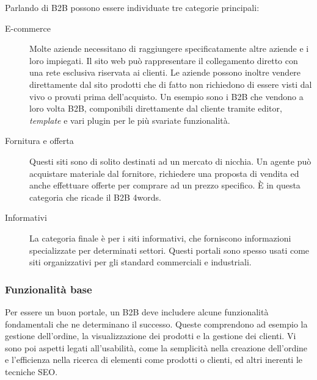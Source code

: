 Parlando di B2B possono essere individuate tre categorie principali:
\begin{description}
	\item[E-commerce] Molte aziende necessitano di raggiungere specificatamente altre aziende e i loro impiegati. Il sito web può rappresentare il collegamento diretto con una rete esclusiva riservata ai clienti. Le aziende possono inoltre vendere direttamente dal sito prodotti che di fatto non richiedono di essere visti dal vivo o provati prima dell'acquisto. Un esempio sono i B2B che vendono a loro volta B2B, componibili direttamente dal cliente tramite editor, \textit{template} e vari plugin per le più svariate funzionalità.
	
	\item[Fornitura e offerta] Questi siti sono di solito destinati ad un mercato di nicchia. Un agente può acquistare materiale dal fornitore, richiedere una proposta di vendita ed anche effettuare offerte per comprare ad un prezzo specifico. È in questa categoria che ricade il B2B 4words.
	
	\item[Informativi] La categoria finale è per i siti informativi, che forniscono informazioni specializzate per determinati settori. Questi portali sono spesso usati come siti organizzativi per gli standard commerciali e industriali.
\end{description}

\subsubsection{Funzionalità base}
Per essere un buon portale, un B2B deve includere alcune funzionalità fondamentali che ne determinano il successo. Queste comprendono ad esempio la gestione dell'ordine, la visualizzazione dei prodotti e la gestione dei clienti. Vi sono poi aspetti legati all'usabilità, come la semplicità nella creazione dell'ordine e l'efficienza nella ricerca di elementi come prodotti o clienti, ed altri inerenti le tecniche SEO.

